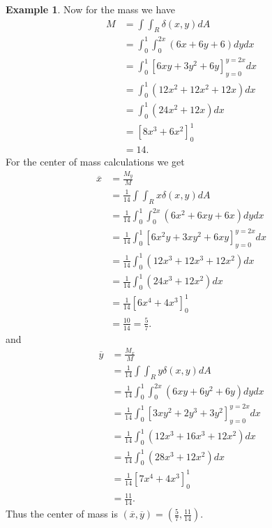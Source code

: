 \documentclass[12pt, letter]{article}
\theoremstyle{plain}
\numberwithin{theorem}{section}
\theoremstyle{definition}
\newtheorem{example}[theorem]{Example}
\begin{document}
\begin{example}
Now for the mass we have
\begin{align*}
M &= \int \int_R \delta(x,y)dA\\
&= \int_0^1 \int_0^{2x} (6x+6y+6)dydx\\
&= \int_0^1 \left[6xy+3y^2+6y\right]_{y=0}^{y=2x} dx\\
&= \int_0^1(12x^2+12x^2+12x)dx\\
&= \int_0^1(24x^2+12x)dx\\
&= \left[8x^3+6x^2\right]_0^1\\
&= 14.
\end{align*}
For the center of mass calculations we get
\begin{align*}
\overline{x} &= \frac{M_y}{M}\\
&= \frac{1}{14} \int \int_R x\delta(x,y)dA\\
&= \frac{1}{14} \int_0^1 \int_0^{2x} (6x^2+6xy+6x)dydx\\
&= \frac{1}{14} \int_0^1 \left[6x^2y+3xy^2+6xy\right]_{y=0}^{y=2x} dx\\
&= \frac{1}{14} \int_0^1(12x^3+12x^3+12x^2)dx\\
&= \frac{1}{14} \int_0^1(24x^3+12x^2)dx\\
&= \frac{1}{14} \left[6x^4+4x^3\right]_0^1\\
&= \frac{10}{14}=\frac{5}{7}.
\end{align*}
and
\begin{align*}
\overline{y} &= \frac{M_x}{M}\\
&= \frac{1}{14} \int \int_R y\delta(x,y)dA\\
&= \frac{1}{14} \int_0^1 \int_0^{2x} (6xy+6y^2+6y)dydx\\
&= \frac{1}{14} \int_0^1 \left[3xy^2+2y^3+3y^2\right]_{y=0}^{y=2x} dx\\
&= \frac{1}{14} \int_0^1(12x^3+16x^3+12x^2)dx\\
&= \frac{1}{14} \int_0^1(28x^3+12x^2)dx\\
&= \frac{1}{14} \left[7x^4+4x^3\right]_0^1\\
&= \frac{11}{14}.
\end{align*}
Thus the center of mass is $(\overline{x},\overline{y}) = \left(\frac{5}{7},\frac{11}{14}\right)$.

\end{example}

\bigskip

\hrulefill

\bigskip

\end{document}
